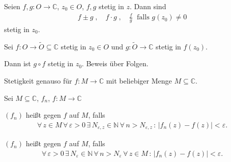 \documentclass[a4paper,10pt]{scrbook}
\begin{document}
\begin{theorem}[Satz]
  \begin{enum-arab}
    \item Seien $f,g : O \to \mathbb{C}$, $z_0 \in O$, $f,g$ stetig in $z$. Dann sind
    \begin{align*}
      f \pm g \; , \quad f \cdot g \; , \quad \frac{f}{g} \; \text{ falls $g(z_0) \neq 0$}
    \end{align*}
    stetig in $z_0$.

    \item Sei $f : O \to \widetilde{O} \subseteq \mathbb{C}$ stetig in $z_0 \in O$ und $g : \widetilde{O} \to \mathbb{C}$ stetig in $f(z_0)$.

    Dann ist $g \circ f$ stetig in $z_0$. Beweis über Folgen.
  \end{enum-arab}
\end{theorem}

\begin{notice}
  Stetigkeit genauso für $f: M \to \mathbb{C}$ mit beliebiger Menge $M \subseteq \mathbb{C}$.
\end{notice}

\begin{theorem}[Funktionenfolgen]
  Sei $M \subseteq \mathbb{C}$, $f_n$, $f : M \to \mathbb{C}$
  \begin{enum-arab}
    \item $(f_n)$ heißt  gegen $f$ auf $M$, falls
    \begin{align*}
      \forall \, z \in M \, \forall \, \varepsilon > 0 \, \exists \, N_{\varepsilon,z} \in \mathbb{N} \, \forall \, n > N_{\varepsilon,z} \, : \, |f_n(z) - f(z)| < \varepsilon.
    \end{align*}
    \item $(f_n)$ heißt  gegen $f$ auf $M$, falls
    \begin{align*}
      \forall \, \varepsilon > 0 \, \exists \, N_{\varepsilon} \in \mathbb{N} \, \forall \, n > N_{\varepsilon} \, \forall \, z \in M \, : \, |f_n(z) - f(z)| < \varepsilon.
    \end{align*}
  \end{enum-arab}
\end{theorem}
\end{document}
